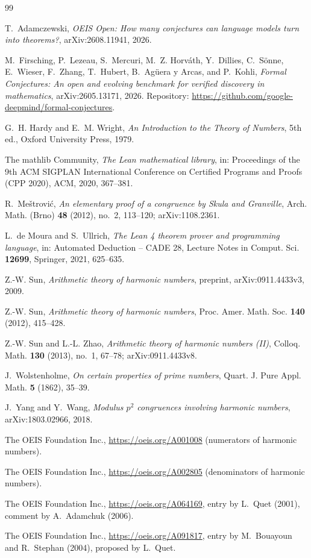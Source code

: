 \documentclass[11pt]{amsart}
\theoremstyle{plain}
\theoremstyle{definition}
\begin{document}
\begin{thebibliography}{99}

T.~Adamczewski, \emph{OEIS Open: How many conjectures can language models turn into theorems?}, arXiv:2608.11941, 2026.

M.~Firsching, P.~Lezeau, S.~Mercuri, M.~Z. Horv\'ath, Y.~Dillies, C.~S\"onne, E.~Wieser, F.~Zhang, T.~Hubert, B.~Ag\"uera y Arcas, and P.~Kohli, \emph{Formal Conjectures: An open and evolving benchmark for verified discovery in mathematics}, arXiv:2605.13171, 2026. Repository: \url{https://github.com/google-deepmind/formal-conjectures}.

G.~H. Hardy and E.~M. Wright, \emph{An Introduction to the Theory of Numbers}, 5th ed., Oxford University Press, 1979.

The mathlib Community, \emph{The Lean mathematical library}, in: Proceedings of the 9th ACM SIGPLAN International Conference on Certified Programs and Proofs (CPP 2020), ACM, 2020, 367--381.

R.~Me\v{s}trovi\'c, \emph{An elementary proof of a congruence by Skula and Granville}, Arch. Math. (Brno) \textbf{48} (2012), no.~2, 113--120; arXiv:1108.2361.

L.~de Moura and S.~Ullrich, \emph{The Lean 4 theorem prover and programming language}, in: Automated Deduction -- CADE 28, Lecture Notes in Comput. Sci. \textbf{12699}, Springer, 2021, 625--635.

Z.-W. Sun, \emph{Arithmetic theory of harmonic numbers}, preprint, arXiv:0911.4433v3, 2009.

Z.-W. Sun, \emph{Arithmetic theory of harmonic numbers}, Proc. Amer. Math. Soc. \textbf{140} (2012), 415--428.

Z.-W. Sun and L.-L. Zhao, \emph{Arithmetic theory of harmonic numbers (II)}, Colloq. Math. \textbf{130} (2013), no.~1, 67--78; arXiv:0911.4433v8.

J.~Wolstenholme, \emph{On certain properties of prime numbers}, Quart. J. Pure Appl. Math. \textbf{5} (1862), 35--39.

J.~Yang and Y.~Wang, \emph{Modulus $p^2$ congruences involving harmonic numbers}, arXiv:1803.02966, 2018.

The OEIS Foundation Inc., \url{https://oeis.org/A001008} (numerators of harmonic numbers).

The OEIS Foundation Inc., \url{https://oeis.org/A002805} (denominators of harmonic numbers).

The OEIS Foundation Inc., \url{https://oeis.org/A064169}, entry by L.~Quet (2001), comment by A.~Adamchuk (2006).

The OEIS Foundation Inc., \url{https://oeis.org/A091817}, entry by M.~Bouayoun and R.~Stephan (2004), proposed by L.~Quet.

\end{thebibliography}
\end{document}
